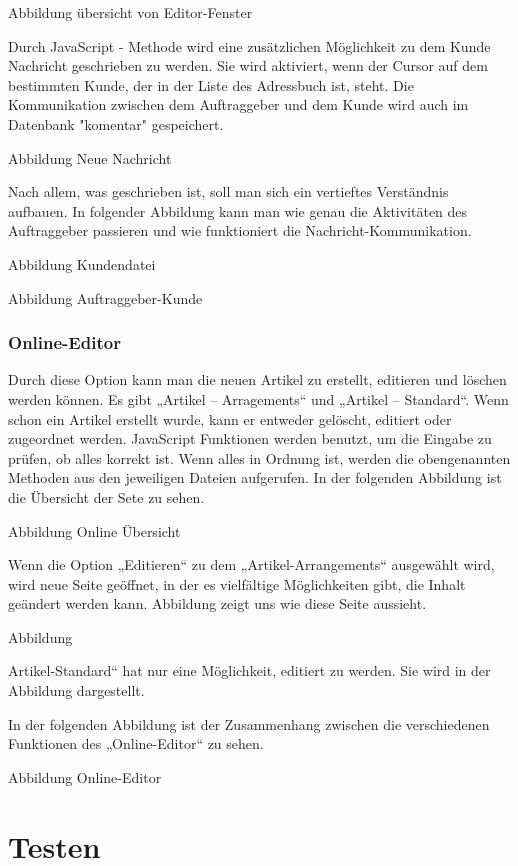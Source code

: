 Abbildung übersicht von Editor-Fenster

Durch JavaScript - Methode wird eine zusätzlichen Möglichkeit zu dem Kunde Nachricht geschrieben zu werden. Sie wird aktiviert, wenn der Cursor auf dem bestimmten Kunde, der in der Liste des Adressbuch ist, steht. Die Kommunikation zwischen dem Auftraggeber und dem  Kunde wird auch im Datenbank "komentar" gespeichert. 

Abbildung Neue Nachricht

Nach allem, was geschrieben ist, soll man sich ein vertieftes Verständnis aufbauen. In folgender Abbildung kann man wie genau die Aktivitäten des Auftraggeber passieren und wie funktioniert die Nachricht-Kommunikation.

Abbildung Kundendatei

Abbildung Auftraggeber-Kunde  

\subsubsection{Online-Editor}

Durch diese Option kann man die neuen Artikel zu erstellt, editieren und löschen werden können.  Es gibt „Artikel – Arragements“ und „Artikel – Standard“. Wenn schon ein Artikel erstellt wurde, kann er entweder gelöscht, editiert oder zugeordnet werden. 
JavaScript Funktionen werden benutzt, um die Eingabe zu prüfen, ob alles korrekt ist. Wenn alles in Ordnung ist, werden die obengenannten Methoden aus den jeweiligen Dateien aufgerufen. In der folgenden Abbildung ist die Übersicht der Sete zu sehen.

Abbildung Online Übersicht

Wenn die Option „Editieren“ zu dem „Artikel-Arrangements“ ausgewählt wird, wird neue Seite geöffnet, in der es vielfältige Möglichkeiten gibt, die Inhalt geändert werden kann. Abbildung   zeigt uns wie diese Seite aussieht.

Abbildung

Artikel-Standard“ hat nur eine Möglichkeit, editiert zu werden. Sie wird in der Abbildung   dargestellt.


In der folgenden Abbildung ist der Zusammenhang zwischen die verschiedenen Funktionen des „Online-Editor“ zu sehen.

Abbildung Online-Editor



\section{Testen} 


